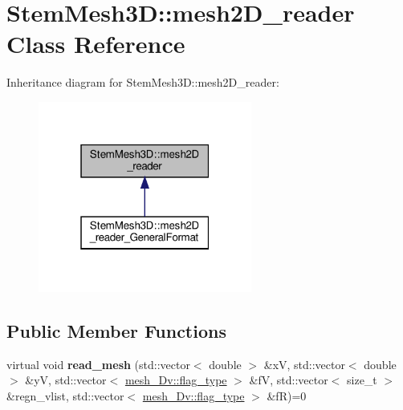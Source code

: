 \hypertarget{classStemMesh3D_1_1mesh2D__reader}{}\section{Stem\+Mesh3D\+:\+:mesh2\+D\+\_\+reader Class Reference}
\label{classStemMesh3D_1_1mesh2D__reader}


Inheritance diagram for Stem\+Mesh3D\+:\+:mesh2\+D\+\_\+reader\+:\nopagebreak
\begin{figure}[H]
\begin{center}
\leavevmode
\includegraphics[width=199pt]{classStemMesh3D_1_1mesh2D__reader__inherit__graph}
\end{center}
\end{figure}
\subsection*{Public Member Functions}
\begin{DoxyCompactItemize}
\item 
\mbox{\label{classStemMesh3D_1_1mesh2D__reader_add60d0182da92d539e7181f661339d04}} 
virtual void {\bfseries read\+\_\+mesh} (std\+::vector$<$ double $>$ \&xV, std\+::vector$<$ double $>$ \&yV, std\+::vector$<$ \hyperlink{classStemMesh3D_1_1mesh__3Dv_a9544cba555b60f17f04fcd1689314338}{mesh\+\_\+Dv\+::flag\+\_\+type} $>$ \&fV, std\+::vector$<$ size\+\_\+t $>$ \&regn\+\_\+vlist, std\+::vector$<$ \hyperlink{classStemMesh3D_1_1mesh__3Dv_a9544cba555b60f17f04fcd1689314338}{mesh\+\_\+Dv\+::flag\+\_\+type} $>$ \&fR)=0
\end{DoxyCompactItemize}

